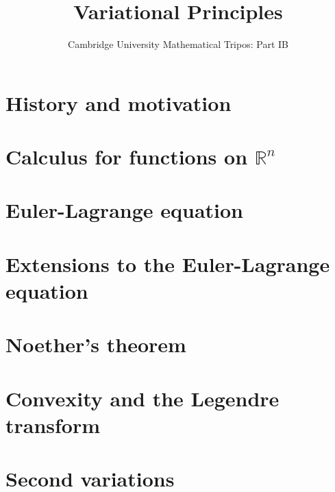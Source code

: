 \documentclass{article}
\title{Variational Principles}
\author{Cambridge University Mathematical Tripos: Part IB}
\begin{document}
\maketitle

\tableofcontentsnewpage{}

\section{History and motivation}

\section{Calculus for functions on \(\mathbb R^n\)}

\section{Euler-Lagrange equation}

\section{Extensions to the Euler-Lagrange equation}

\section{Noether's theorem}

\section{Convexity and the Legendre transform}

\section{Second variations}

\end{document}
